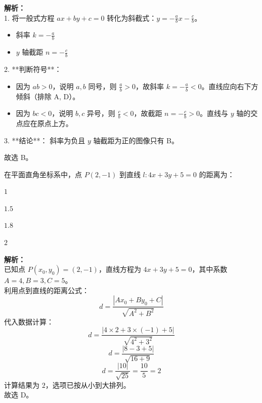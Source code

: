 \begin{solution}
    \textbf{解析：} \\
    1. 将一般式方程 $ax + by + c = 0$ 转化为斜截式：$y = -\frac{a}{b}x - \frac{c}{b}$。
    \begin{itemize}
        \item 斜率 $k = -\frac{a}{b}$
        \item $y$ 轴截距 $n = -\frac{c}{b}$
    \end{itemize}
    
    2. **判断符号**：
    \begin{itemize}
        \item 因为 $ab > 0$，说明 $a, b$ 同号，则 $\frac{a}{b} > 0$，故斜率 $k = -\frac{a}{b} < 0$。直线应向右下方倾斜（排除 A, D）。
        \item 因为 $bc < 0$，说明 $b, c$ 异号，则 $\frac{c}{b} < 0$，故截距 $n = -\frac{c}{b} > 0$。直线与 $y$ 轴的交点应在原点上方。
    \end{itemize}
    
    3. **结论**：
    斜率为负且 $y$ 轴截距为正的图像只有 B。
    
    故选 B。
\end{solution}

\begin{question}
    在平面直角坐标系中，点 $P(2, -1)$ 到直线 $l: 4x + 3y + 5 = 0$ 的距离为： \paren[D]
    \begin{choices}
        \item $1$ \item $1.5$ \item $1.8$ \item $2$
    \end{choices}
\end{question}

\begin{solution}
    \textbf{解析：} \\
    已知点 $P(x_0, y_0) = (2, -1)$，直线方程为 $4x + 3y + 5 = 0$，其中系数 $A=4, B=3, C=5$。 \\
    利用点到直线的距离公式：
    $$\displaystyle d = \frac{|Ax_0 + By_0 + C|}{\sqrt{A^2 + B^2}}$$
    代入数据计算：
    $$\displaystyle d = \frac{|4 \times 2 + 3 \times (-1) + 5|}{\sqrt{4^2 + 3^2}}$$
    $$\displaystyle d = \frac{|8 - 3 + 5|}{\sqrt{16 + 9}}$$
    $$\displaystyle d = \frac{|10|}{\sqrt{25}} = \frac{10}{5} = 2$$
    计算结果为 $2$，选项已按从小到大排列。 \\
    故选 D。
\end{solution}




